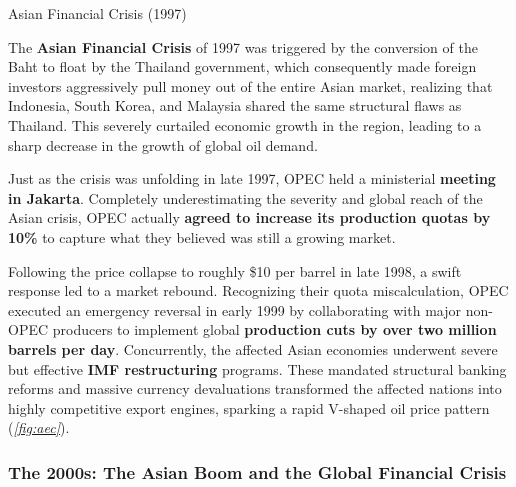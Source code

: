 \documentclass[10pt]{article}
\begin{document}
      \begin{core}[label=core:aec]{Asian Financial Crisis (1997)}

        The \textbf{Asian Financial Crisis} of 1997 was triggered by the conversion of the Baht to float by the Thailand government, which consequently made foreign investors aggressively pull money out of the entire Asian market, realizing that Indonesia, South Korea, and Malaysia shared the same structural flaws as Thailand. This severely curtailed economic growth in the region, leading to a sharp decrease in the growth of global oil demand.

        Just as the crisis was unfolding in late 1997, OPEC held a ministerial \textbf{meeting in Jakarta}. Completely underestimating the severity and global reach of the Asian crisis, OPEC actually \textbf{agreed to increase its production quotas by 10\%} to capture what they believed was still a growing market.


        Following the price collapse to roughly \$10 per barrel in late 1998, a swift response led to a market rebound. Recognizing their quota miscalculation, OPEC executed an emergency reversal in early 1999 by collaborating with major non-OPEC producers to implement global \textbf{production cuts by over two million barrels per day}. Concurrently, the affected Asian economies underwent severe but effective \textbf{IMF restructuring} programs. These mandated structural banking reforms and massive currency devaluations transformed the affected nations into highly competitive export engines, sparking a rapid V-shaped oil price pattern (\textit{\autoref{fig:aec}}). 

      \end{core}

    \subsubsection{The 2000s: The Asian Boom and the Global Financial Crisis}
\end{document}
